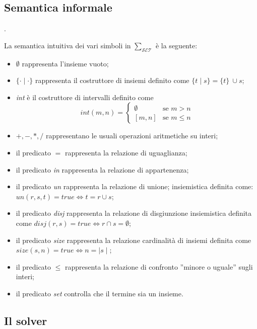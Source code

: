 \documentclass[12pt,a4paper,openright]{book} %
\begin{document}
\subsection{Semantica informale}.
\label{subsec:lang_clpset_semantics}

La semantica intuitiva dei vari simboli in $\sum_{\mathcal{SET}}$ è la seguente:

\begin{itemize}
\item $\emptyset$ rappresenta l’insieme vuoto;
\item $\{\cdot\mid\cdot\}$ rappresenta il costruttore di insiemi definito come $\{t\mid s\} = \{t\}\ \cup s$;
\item \textit{int} è il costruttore di intervalli definito come
\begin{equation}
int (m, n ) =
  \begin{cases}
    \emptyset & \text{se } m > n \\
    [ m, n ] & \text{se } m \leq n
  \end{cases}
\end{equation}
\item $+, -, \ast, /$ rappresentano le usuali operazioni aritmetiche su interi;
\item il predicato $=$ rappresenta la relazione di uguaglianza;
\item il predicato \textit{in} rappresenta la relazione di appartenenza;
\item il predicato \textit{un} rappresenta la relazione di unione; insiemistica definita come:
$un(r,s,t) = true \Longleftrightarrow t = r \cup s$;
\item il predicato \textit{disj} rappresenta la relazione di disgiunzione insiemistica definita come
$disj(r,s) = true \Longleftrightarrow r \cap s = \emptyset$;
\item il predicato \textit{size} rappresenta la relazione cardinalità di insiemi definita come $size(s, n) = true \Longleftrightarrow n = \mid s \mid$;
\item il predicato $\leq$ rappresenta la relazione di confronto ”minore o uguale” sugli interi;
\item il predicato \textit{set} controlla che il termine sia un insieme.
\end{itemize}

\subsection{Il solver \satset{}}
\label{subsec:lang_clpset_solver}
\end{document}
